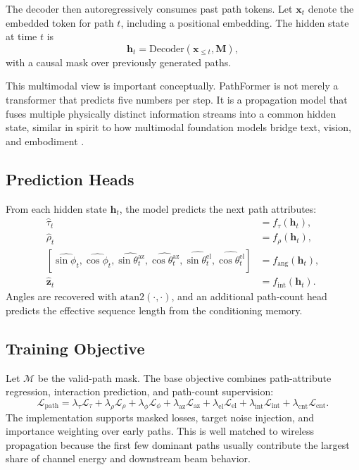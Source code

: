\documentclass[11pt]{article}
\begin{document}
The decoder then autoregressively consumes past path tokens. Let $\mathbf{x}_t$ denote the embedded token for path $t$, including a positional embedding. The hidden state at time $t$ is
\begin{equation}
\mathbf{h}_t = \mathrm{Decoder}(\mathbf{x}_{\le t}, \mathbf{M}),
\end{equation}
with a causal mask over previously generated paths.

This multimodal view is important conceptually. PathFormer is not merely a transformer that predicts five numbers per step. It is a propagation model that fuses multiple physically distinct information streams into a common hidden state, similar in spirit to how multimodal foundation models bridge text, vision, and embodiment \cite{flamingo,blip2,palme}.

\subsection{Prediction Heads}
From each hidden state $\mathbf{h}_t$, the model predicts the next path attributes:
\begin{align}
\hat{\tau}_t &= f_{\tau}(\mathbf{h}_t), \\
\hat{\rho}_t &= f_{\rho}(\mathbf{h}_t), \\
[\widehat{\sin\phi_t},\widehat{\cos\phi_t},
\widehat{\sin\theta_t^{\mathrm{az}}},\widehat{\cos\theta_t^{\mathrm{az}}},
\widehat{\sin\theta_t^{\mathrm{el}}},\widehat{\cos\theta_t^{\mathrm{el}}}]
&= f_{\mathrm{ang}}(\mathbf{h}_t), \\
\hat{\mathbf{z}}_t &= f_{\mathrm{int}}(\mathbf{h}_t).
\end{align}
Angles are recovered with $\mathrm{atan2}(\cdot,\cdot)$, and an additional path-count head predicts the effective sequence length from the conditioning memory.

\subsection{Training Objective}
Let $\mathcal{M}$ be the valid-path mask. The base objective combines path-attribute regression, interaction prediction, and path-count supervision:
\begin{equation}
\mathcal{L}_{\mathrm{path}}
=
\lambda_{\tau}\mathcal{L}_{\tau}
+ \lambda_{\rho}\mathcal{L}_{\rho}
+ \lambda_{\phi}\mathcal{L}_{\phi}
+ \lambda_{\mathrm{az}}\mathcal{L}_{\mathrm{az}}
+ \lambda_{\mathrm{el}}\mathcal{L}_{\mathrm{el}}
+ \lambda_{\mathrm{int}}\mathcal{L}_{\mathrm{int}}
+ \lambda_{\mathrm{cnt}}\mathcal{L}_{\mathrm{cnt}}.
\label{eq:loss}
\end{equation}
The implementation supports masked losses, target noise injection, and importance weighting over early paths. This is well matched to wireless propagation because the first few dominant paths usually contribute the largest share of channel energy and downstream beam behavior.
\end{document}
